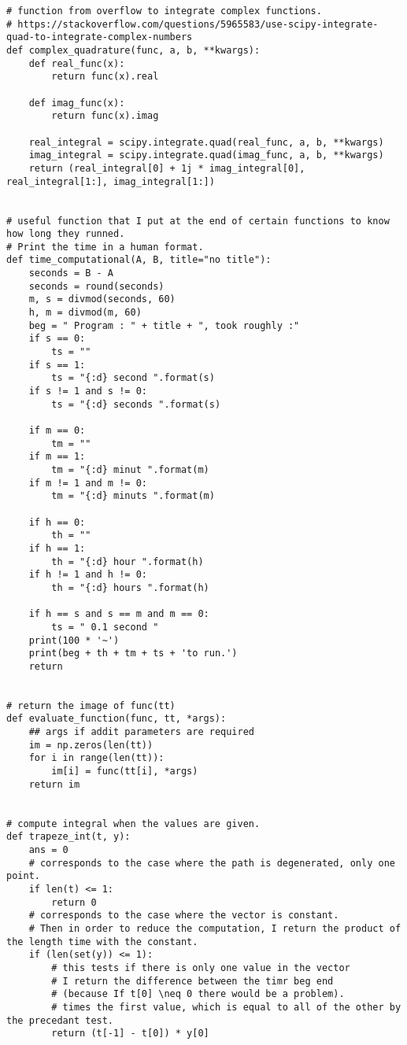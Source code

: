 \begin{Verbatim}[fontsize=\tiny]
# function from overflow to integrate complex functions.
# https://stackoverflow.com/questions/5965583/use-scipy-integrate-quad-to-integrate-complex-numbers
def complex_quadrature(func, a, b, **kwargs):
    def real_func(x):
        return func(x).real

    def imag_func(x):
        return func(x).imag

    real_integral = scipy.integrate.quad(real_func, a, b, **kwargs)
    imag_integral = scipy.integrate.quad(imag_func, a, b, **kwargs)
    return (real_integral[0] + 1j * imag_integral[0], real_integral[1:], imag_integral[1:])


# useful function that I put at the end of certain functions to know how long they runned.
# Print the time in a human format.
def time_computational(A, B, title="no title"):
    seconds = B - A
    seconds = round(seconds)
    m, s = divmod(seconds, 60)
    h, m = divmod(m, 60)
    beg = " Program : " + title + ", took roughly :"
    if s == 0:
        ts = ""
    if s == 1:
        ts = "{:d} second ".format(s)
    if s != 1 and s != 0:
        ts = "{:d} seconds ".format(s)

    if m == 0:
        tm = ""
    if m == 1:
        tm = "{:d} minut ".format(m)
    if m != 1 and m != 0:
        tm = "{:d} minuts ".format(m)

    if h == 0:
        th = ""
    if h == 1:
        th = "{:d} hour ".format(h)
    if h != 1 and h != 0:
        th = "{:d} hours ".format(h)

    if h == s and s == m and m == 0:
        ts = " 0.1 second "
    print(100 * '~')
    print(beg + th + tm + ts + 'to run.')
    return


# return the image of func(tt)
def evaluate_function(func, tt, *args):
    ## args if addit parameters are required
    im = np.zeros(len(tt))
    for i in range(len(tt)):
        im[i] = func(tt[i], *args)
    return im


# compute integral when the values are given.
def trapeze_int(t, y):
    ans = 0
    # corresponds to the case where the path is degenerated, only one point.
    if len(t) <= 1:
        return 0
    # corresponds to the case where the vector is constant.
    # Then in order to reduce the computation, I return the product of the length time with the constant.
    if (len(set(y)) <= 1):
        # this tests if there is only one value in the vector
        # I return the difference between the timr beg end
        # (because If t[0] \neq 0 there would be a problem).
        # times the first value, which is equal to all of the other by the precedant test.
        return (t[-1] - t[0]) * y[0]


\end{Verbatim}
